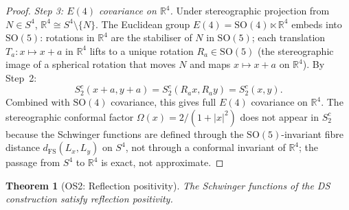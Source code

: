 \documentclass[11pt,a4paper]{article}
\newtheorem{theorem}{Theorem}[section]
\theoremstyle{definition}
\theoremstyle{remark}
\newcommand{\R}{\mathbb{R}}
\begin{document}
\begin{proof}
\emph{Step 3: $E(4)$ covariance on $\R^4$.} Under stereographic projection from $N\in S^4$, $\R^4\cong S^4\setminus\{N\}$. The Euclidean group $E(4)=\mathrm{SO}(4)\ltimes\R^4$ embeds into $\mathrm{SO}(5)$: rotations in $\R^4$ are the stabiliser of $N$ in $\mathrm{SO}(5)$; each translation $T_a:x\mapsto x+a$ in $\R^4$ lifts to a unique rotation $R_a\in\mathrm{SO}(5)$ (the stereographic image of a spherical rotation that moves $N$ and maps $x\mapsto x+a$ on $\R^4$). By Step~2:
\[
S_2^c(x+a,y+a)=S_2^c(R_a x,R_a y)=S_2^c(x,y).
\]
Combined with $\mathrm{SO}(4)$ covariance, this gives full $E(4)$ covariance on $\R^4$. The stereographic conformal factor $\Omega(x)=2/(1+|x|^2)$ does not appear in $S_2^c$ because the Schwinger functions are defined through the $\mathrm{SO}(5)$-invariant fibre distance $d_{\mathrm{FS}}(L_x,L_y)$ on $S^4$, not through a conformal invariant of $\R^4$; the passage from $S^4$ to $\R^4$ is exact, not approximate.
\end{proof}

\begin{theorem}[OS2: Reflection positivity]\label{thm:OS2}
The Schwinger functions of the DS construction satisfy reflection positivity.
\end{theorem}
\end{document}
